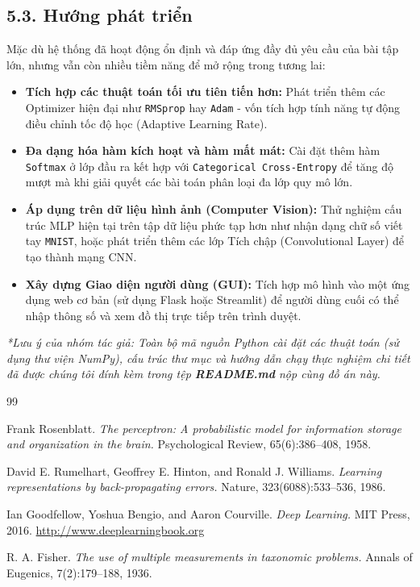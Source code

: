 \documentclass[13pt,a4paper]{article}
\begin{document}
\subsection*{5.3. Hướng phát triển}
Mặc dù hệ thống đã hoạt động ổn định và đáp ứng đầy đủ yêu cầu của bài tập lớn, nhưng vẫn còn nhiều tiềm năng để mở rộng trong tương lai:
\begin{itemize}
    \item \textbf{Tích hợp các thuật toán tối ưu tiên tiến hơn:} Phát triển thêm các Optimizer hiện đại như \texttt{RMSprop} hay \texttt{Adam} - vốn tích hợp tính năng tự động điều chỉnh tốc độ học (Adaptive Learning Rate).
    \item \textbf{Đa dạng hóa hàm kích hoạt và hàm mất mát:} Cài đặt thêm hàm \texttt{Softmax} ở lớp đầu ra kết hợp với \texttt{Categorical Cross-Entropy} để tăng độ mượt mà khi giải quyết các bài toán phân loại đa lớp quy mô lớn.
    \item \textbf{Áp dụng trên dữ liệu hình ảnh (Computer Vision):} Thử nghiệm cấu trúc MLP hiện tại trên tập dữ liệu phức tạp hơn như nhận dạng chữ số viết tay \texttt{MNIST}, hoặc phát triển thêm các lớp Tích chập (Convolutional Layer) để tạo thành mạng CNN.
    \item \textbf{Xây dựng Giao diện người dùng (GUI):} Tích hợp mô hình vào một ứng dụng web cơ bản (sử dụng Flask hoặc Streamlit) để người dùng cuối có thể nhập thông số và xem đồ thị trực tiếp trên trình duyệt.
\end{itemize}
\vspace{1cm}
\noindent\textit{*Lưu ý của nhóm tác giả: Toàn bộ mã nguồn Python cài đặt các thuật toán (sử dụng thư viện NumPy), cấu trúc thư mục và hướng dẫn chạy thực nghiệm chi tiết đã được chúng tôi đính kèm trong tệp \textbf{README.md} nộp cùng đồ án này.}

\newpage
\renewcommand{\refname}{\begin{center} TÀI LIỆU THAM KHẢO \end{center}}
\begin{thebibliography}{99}

Frank Rosenblatt. 
\textit{The perceptron: A probabilistic model for information storage and organization in the brain.} 
Psychological Review, 65(6):386–408, 1958.

David E. Rumelhart, Geoffrey E. Hinton, and Ronald J. Williams.
\textit{Learning representations by back-propagating errors.}
Nature, 323(6088):533–536, 1986.

Ian Goodfellow, Yoshua Bengio, and Aaron Courville.
\textit{Deep Learning.}
MIT Press, 2016. \url{http://www.deeplearningbook.org}

R. A. Fisher.
\textit{The use of multiple measurements in taxonomic problems.}
Annals of Eugenics, 7(2):179–188, 1936.

\end{thebibliography}
\end{document}
